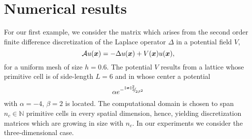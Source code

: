 \documentclass[12pt]{article}
\begin{document}

\section{Numerical results}
\label{sec:results}

For our first example, we consider the matrix which arises from the second order
finite difference discretization of the Laplace operator $\Delta$ in a potential
field $V$,
\begin{equation}
    \mathcal{A} u(\boldsymbol{x}) = - \Delta u(\boldsymbol{x}) + V(\boldsymbol{x}) u(\boldsymbol{x}),
    \label{equ:5-experiments-electronic-hamiltonian}
\end{equation}
for a uniform mesh of size $h=0.6$. The potential $V$ results from a
lattice whose primitive cell is of side-length $L=6$ and in whose center a
potential
\begin{equation}
    \alpha e^{-{}^{\lVert \boldsymbol{x} \rVert _2^2}{\mskip -5mu/\mskip -3mu}_{ 2 \beta^2 }}
    \label{equ:5-experiments-gaussian-cell}
\end{equation}
with $\alpha = -4$, $\beta = 2$ is located. The computational domain is chosen
to span $n_c \in \mathbb{N}$ primitive cells in every spatial dimension, hence, yielding
discretization matrices which are growing in size with $n_c$. In our experiments
we consider the three-dimensional case.%

%        
%        
%        
\end{document}
